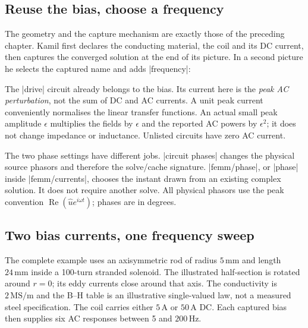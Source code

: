 \subsection{Reuse the bias, choose a frequency}
The geometry and the capture mechanism are exactly those of the preceding
chapter. Kamil first declares the conducting material, the coil and its DC
current, then captures the converged solution at the end of its picture.
In a second picture he selects the captured name and adds |frequency|:
\begin{codeexample}
\end{codeexample}
The |drive| circuit already belongs to the bias. Its current here is the
\emph{peak AC perturbation}, not the sum of DC and AC currents. A unit peak
current conveniently normalises the linear transfer functions. An actual
small peak amplitude $\epsilon$ multiplies the fields by $\epsilon$ and the
reported AC powers by $\epsilon^2$; it does not change impedance or inductance.
Unlisted circuits have zero AC current.

The two phase settings have different jobs. |circuit phases| changes the
physical source phasors and therefore the solve/cache signature.
|femm/phase|, or |phase| inside |femm/currents|, chooses the instant drawn from
an existing complex solution. It does not require another solve. All physical
phasors use the peak convention $\operatorname{Re}(\widehat u e^{i\omega t})$;
phases are in degrees.

\subsection{Two bias currents, one frequency sweep}
The complete example uses an axisymmetric rod of radius $5\,\mathrm{mm}$ and
length $24\,\mathrm{mm}$ inside a 100-turn stranded solenoid. The illustrated
half-section is rotated around $r=0$; its eddy currents close around that axis.
The conductivity is $2\,\mathrm{MS/m}$ and the B--H table is an illustrative
single-valued law, not a measured steel specification. The coil carries either
$5\,\mathrm A$ or $50\,\mathrm A$ DC. Each captured bias then supplies six
AC responses between 5 and $200\,\mathrm{Hz}$.

